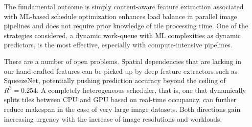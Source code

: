 \documentclass[acmsmall]{acmart}
\begin{document}
The fundamental outcome is simply content-aware feature extraction associated with ML-based schedule optimization enhances load balance in parallel image pipelines and does not require prior knowledge of tile processing time.
One of the strategies considered, a dynamic work-queue with ML complexities as dynamic predictors, is the most effective, especially with compute-intensive pipelines.

There are a number of open problems.
Spatial dependencies that are lacking in our hand-crafted features can be picked up by deep feature extractors such as SqueezeNet, potentially pushing prediction accuracy beyond the ceiling of $R^2 = 0.254$.
A completely heterogeneous scheduler, that is, one that dynamically splits tiles between CPU and GPU based on real-time occupancy, can further reduce makespan in the case of very large image datasets.
Both directions gain increasing urgency with the increase of image resolutions and workloads.



\end{document}
